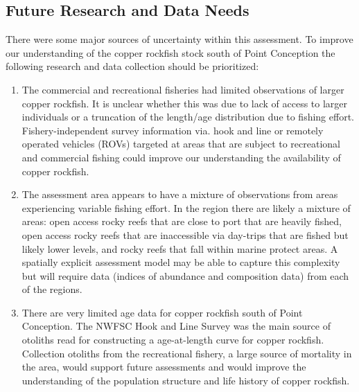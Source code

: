 \documentclass[11pt,
  english,
  a4paper,
]{article}
\begin{document}
\leavevmode\tagmcend\tagstructend\par


\hypertarget{future-research-and-data-needs}{%
\subsection{Future Research and Data Needs}\label{future-research-and-data-needs}}

\leavevmode\tagmcend\tagstructend


There were some major sources of uncertainty within this assessment. To improve our understanding of the copper rockfish stock south of Point Conception the following research and data collection should be prioritized:

\leavevmode\tagmcend\tagstructend\par

\begin{enumerate}

    \item The commercial and recreational fisheries had limited observations of larger copper rockfish.  It is unclear whether this was due to lack of access to larger individuals or a truncation of the length/age distribution due to fishing effort. Fishery-independent survey information via. hook and line or remotely operated vehicles (ROVs) targeted at areas that are subject to recreational and commercial fishing could improve our understanding the availability of copper rockfish.

    \item The assessment area appears to have a mixture of observations from areas experiencing variable fishing effort.  In the region there are likely a mixture of areas: open access rocky reefs that are close to port that are heavily fished, open access rocky reefs that are inaccessible via day-trips that are fished but likely lower levels, and rocky reefs that fall within marine protect areas.  A spatially explicit assessment model may be able to capture this complexity but will require data (indices of abundance and composition data) from each of the regions. 

    \item There are very limited age data for copper rockfish south of Point Conception. The NWFSC Hook and Line Survey was the main source of otoliths read for constructing a age-at-length curve for copper rockfish. Collection otoliths from the recreational fishery, a large source of mortality in the area, would support future assessments  and would improve the understanding of the population structure and life history of copper rockfish. 

\end{enumerate}
\end{document}
